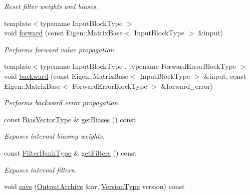 \begin{DoxyCompactItemize}
\begin{DoxyCompactList}\small\item\em Reset filter weights and biases. \end{DoxyCompactList}\item 
{\footnotesize template$<$typename Input\-Block\-Type $>$ }\\void \hyperlink{classffnn_1_1layer_1_1_convolution_volume_a0145b555b05e8f0e5d7e5a740f21a890}{forward} (const Eigen\-::\-Matrix\-Base$<$ Input\-Block\-Type $>$ \&input)
\begin{DoxyCompactList}\small\item\em Performs forward value propagation. \end{DoxyCompactList}\item 
{\footnotesize template$<$typename Input\-Block\-Type , typename Forward\-Error\-Block\-Type $>$ }\\void \hyperlink{classffnn_1_1layer_1_1_convolution_volume_a0c69cf588f0d3b656f17d4c7e2229a1b}{backward} (const Eigen\-::\-Matrix\-Base$<$ Input\-Block\-Type $>$ \&input, const Eigen\-::\-Matrix\-Base$<$ Forward\-Error\-Block\-Type $>$ \&forward\-\_\-error)
\begin{DoxyCompactList}\small\item\em Performs backward error propagation. \end{DoxyCompactList}\item 
const \hyperlink{classffnn_1_1layer_1_1_convolution_volume_ac2655aee05415e5ffc76cf7b0ba64e61}{Bias\-Vector\-Type} \& \hyperlink{classffnn_1_1layer_1_1_convolution_volume_ae1dbed16d230d7ecc8d05e82cc5b087b}{get\-Biases} () const 
\begin{DoxyCompactList}\small\item\em Exposes internal biasing weights. \end{DoxyCompactList}\item 
const \hyperlink{classffnn_1_1layer_1_1_convolution_volume_a73cb805b7ffa2bc96461412e1cf958f9}{Filter\-Bank\-Type} \& \hyperlink{classffnn_1_1layer_1_1_convolution_volume_a9c0858bc9ec53071a5d0eb083772d9ac}{get\-Filters} () const 
\begin{DoxyCompactList}\small\item\em Exposes internal filters. \end{DoxyCompactList}\item 
void \hyperlink{classffnn_1_1layer_1_1_convolution_volume_a52d21f4ee6b841d154b1dc63bd3ed4bf}{save} (\hyperlink{classffnn_1_1traits_1_1_serializable_a08d986df75d363fa79506d4f6045cb9f}{Output\-Archive} \&ar, \hyperlink{classffnn_1_1traits_1_1_serializable_a08924b3b7d20cb3cb6eafe517d4f7b30}{Version\-Type} version) const 

\end{DoxyCompactItemize}
